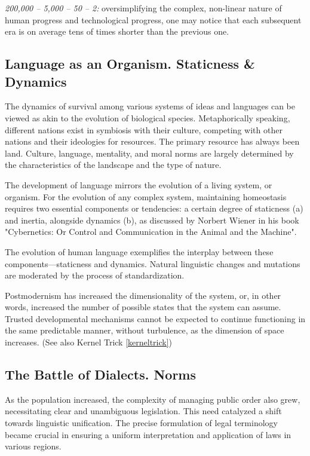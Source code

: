 \documentclass[11pt,a4]{article}
\begin{document}
        \textit{200,000 – 5,000 – 50 – 2:}
        oversimplifying the complex, non-linear nature of human progress and technological progress, one may
        notice that each subsequent era is on average tens of times shorter than the previous one.


\subsection{Language as an Organism. Staticness \& Dynamics}

    The dynamics of survival among various systems of ideas and
    languages can be viewed as akin to the
    evolution of biological species. Metaphorically speaking,
    different nations exist in symbiosis with
    their culture, competing with other nations and their ideologies for resources.
    The primary resource has always been land. Culture, language, mentality, and moral norms are largely
    determined by the characteristics of the landscape and the type of nature.

    The development of language mirrors the evolution of a
    living system, or organism. For the evolution
    of any complex system, maintaining homeostasis
    requires two essential components or tendencies:
    a certain degree of staticness (a) and inertia, alongside dynamics (b), as discussed by Norbert
    Wiener in his book "Cybernetics: Or Control and Communication in the Animal and the Machine"\cite{Wiener}.

    The evolution of human language exemplifies the interplay between these components---staticness and dynamics.
    Natural linguistic changes and mutations are moderated by the process of standardization.

    Postmodernism has increased the dimensionality of the system, or, in other words, increased the
    number of possible states that the system can assume. Trusted developmental mechanisms cannot
    be expected to continue functioning in the same predictable manner, without turbulence, as the
    dimension of space increases. (See also Kernel Trick \ref{kerneltrick})

\subsection{The Battle of Dialects. Norms}

    As the population increased, the complexity of managing public order also grew,
    necessitating clear and unambiguous legislation. This need catalyzed a shift towards
     linguistic unification. The precise formulation of legal terminology became crucial
     in ensuring a uniform interpretation and application of laws in various regions.
\end{document}
